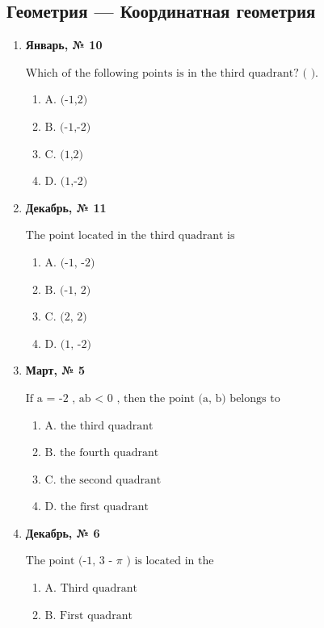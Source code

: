 \subsection*{Геометрия — Координатная геометрия}
\begin{enumerate}
\item \textbf{Январь, № 10} \par \smallskip
$\displaystyle \text{Which of the following points is in the third quadrant? ( ).}$
\begin{enumerate}
\item $\displaystyle \text{A. (-1,2)}$
\item $\displaystyle \text{B. (-1,-2)}$
\item $\displaystyle \text{C. (1,2)}$
\item $\displaystyle \text{D. (1,-2)}$
\end{enumerate}
\item \textbf{Декабрь, № 11} \par \smallskip
$\displaystyle \text{The point located in the third quadrant is}$
\begin{enumerate}
\item $\displaystyle \text{A. (-1, -2)}$
\item $\displaystyle \text{B. (-1, 2)}$
\item $\displaystyle \text{C. (2, 2)}$
\item $\displaystyle \text{D. (1, -2)}$
\end{enumerate}
\item \textbf{Март, № 5} \par \smallskip
$\displaystyle \text{If a = -2 , ab < 0 , then the point (a, b) belongs to}$
\begin{enumerate}
\item $\displaystyle \text{A. the third quadrant}$
\item $\displaystyle \text{B. the fourth quadrant}$
\item $\displaystyle \text{C. the second quadrant}$
\item $\displaystyle \text{D. the first quadrant}$
\end{enumerate}
\item \textbf{Декабрь, № 6} \par \smallskip
$\displaystyle \text{The point (-1, 3 - }\pi\text{ ) is located in the}$
\begin{enumerate}
\item $\displaystyle \text{A.  Third quadrant}$
\item $\displaystyle \text{B.  First quadrant}$

\end{enumerate}
\end{enumerate}

